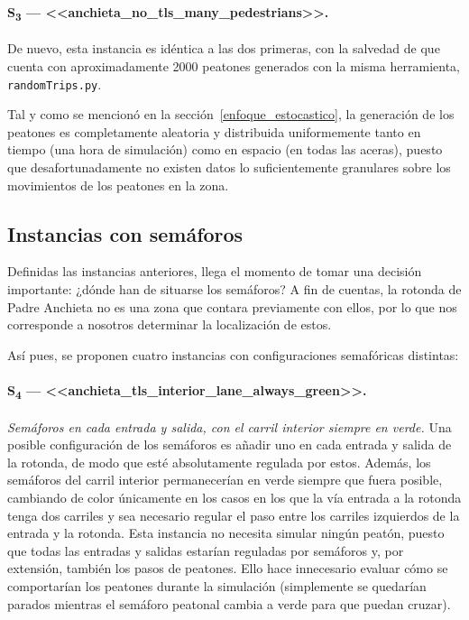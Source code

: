 \paragraph{S\textsubscript{3} --- <<anchieta\_no\_tls\_many\_pedestrians>>.} De nuevo, esta instancia es idéntica a las dos primeras, con la salvedad de que cuenta con aproximadamente 2000 peatones generados con la misma herramienta, \texttt{randomTrips.py}.

\bigskip
Tal y como se mencionó en la sección~\ref{enfoque_estocastico}, la generación de los peatones es completamente aleatoria y distribuida uniformemente tanto en tiempo (una hora de simulación) como en espacio (en todas las aceras), puesto que desafortunadamente no existen datos lo suficientemente granulares sobre los movimientos de los peatones en la zona.


\subsection{Instancias con semáforos}
\label{subsec:instancias}

Definidas las instancias anteriores, llega el momento de tomar una decisión importante: ¿dónde han de situarse los semáforos? A fin de cuentas, la rotonda de Padre Anchieta no es una zona que contara previamente con ellos, por lo que nos corresponde a nosotros determinar la localización de estos.

Así pues, se proponen cuatro instancias con configuraciones semafóricas distintas:

\paragraph{S\textsubscript{4} --- <<anchieta\_tls\_interior\_lane\_always\_green>>.} \textit{Semáforos en cada entrada y salida, con el carril interior siempre en verde.} Una posible configuración de los semáforos es añadir uno en cada entrada y salida de la rotonda, de modo que esté absolutamente regulada por estos. Además, los semáforos del carril interior permanecerían en verde siempre que fuera posible, cambiando de color únicamente en los casos en los que la vía entrada a la rotonda tenga dos carriles y sea necesario regular el paso entre los carriles izquierdos de la entrada y la rotonda. Esta instancia no necesita simular ningún peatón, puesto que todas las entradas y salidas estarían reguladas por semáforos y, por extensión, también los pasos de peatones. Ello hace innecesario evaluar cómo se comportarían los peatones durante la simulación (simplemente se quedarían parados mientras el semáforo peatonal cambia a verde para que puedan cruzar).

